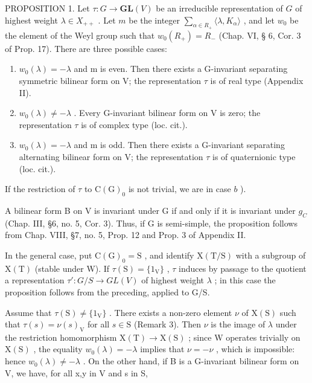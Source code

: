 PROPOSITION 1. Let \(\tau : G \to \mathbf{GL}(V)\) be an irreducible representation of \(G\) of highest weight \(\lambda \in X_{++}\) . Let \(m\) be the integer \(\sum_{\alpha \in R_+} \langle \lambda, K_\alpha \rangle\) , and let \(w_0\) be the element of the Weyl group such that \(w_0(R_+) = R_-\) (Chap. VI, § 6, Cor. 3 of Prop. 17). There are three possible cases:

\begin{enumerate}
\def\labelenumi{\alph{enumi})}
\item
  \(w_{0}(\lambda) = -\lambda\) and m is even. Then there exists a G-invariant separating symmetric bilinear form on V; the representation \(\tau\) is of real type (Appendix II).
\item
  \(w_{0}(\lambda) \neq -\lambda\) . Every G-invariant bilinear form on V is zero; the representation \(\tau\) is of complex type (loc. cit.).
\item
  \(w_{0}(\lambda) = -\lambda\) and m is odd. Then there exists a G-invariant separating alternating bilinear form on V; the representation \(\tau\) is of quaternionic type (loc. cit.).
\end{enumerate}

If the restriction of \(\tau\) to \(\mathrm{C}(\mathrm{G})_0\) is not trivial, we are in case \(b\) ).

A bilinear form B on V is invariant under G if and only if it is invariant under \(g_{C}\) (Chap. III, §6, no. 5, Cor. 3). Thus, if G is semi-simple, the proposition follows from Chap. VIII, §7, no. 5, Prop. 12 and Prop. 3 of Appendix II.

In the general case, put \(\mathrm{C}(\mathrm{G})_{0} = \mathrm{S}\) , and identify \(\mathrm{X}(\mathrm{T}/\mathrm{S})\) with a subgroup of \(\mathrm{X}(\mathrm{T})\) (stable under W). If \(\tau(\mathrm{S}) = \{1_{\mathrm{V}}\}\) , \(\tau\) induces by passage to the quotient a representation \(\tau' : G/S \to GL(V)\) of highest weight \(\lambda\) ; in this case the proposition follows from the preceding, applied to G/S.

Assume that \(\tau (\mathrm{S})\neq \{1_{\mathrm{V}}\}\) . There exists a non-zero element \(\nu\) of \(\mathrm{X(S)}\) such that \(\tau (s) = \nu (s)_{\mathrm{V}}\) for all \(s\in \mathrm{S}\) (Remark 3). Then \(\nu\) is the image of \(\lambda\) under the restriction homomorphism \(\mathrm{X}(\mathrm{T})\to\mathrm{X}(\mathrm{S})\) ; since W operates trivially on \(\mathrm{X}(\mathrm{S})\) , the equality \(w_{0}(\lambda)=-\lambda\) implies that \(\nu=-\nu\) , which is impossible: hence \(w_{0}(\lambda)\neq-\lambda\) . On the other hand, if B is a G-invariant bilinear form on V, we have, for all x,y in V and s in S,


